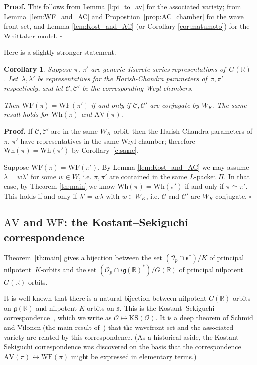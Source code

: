 \documentclass[10pt,leqno]{article}
\newtheorem{corollary}[equation]{Corollary}
\numberwithin{equation}{section}
\newcommand{\qed}{\hfill $\square$ \medskip}
\newenvironment{proof}[1][Proof]{\noindent\textbf{#1.} }{\qed}
\renewcommand{\O}{\mathcal O}
\newcommand{\R}{\mathbb R}
\newcommand{\g}{\mathfrak g}
\newcommand{\s}{\mathfrak s}
\newcommand{\AV}{\mathrm{AV}}
\newcommand{\KS}{\mathrm{KS}}
\newcommand{\Wh}{\mathrm{Wh}}
\newcommand{\WF}{\mathrm{WF}}
\newcommand{\Op}{\O_p}
\begin{document}
\begin{proof}
This follows from Lemma \ref{l:pi_to_av} for the associated variety;
from Lemma~\ref{lem:WF_and_AC} and Proposition~\ref{prop:AC_chamber} for the wave front set, and Lemma \ref{lem:Kost_and_AC} (or Corollary \ref{cor:matumoto})
for the Whittaker model.
\end{proof}

Here is a slightly stronger statement.

\begin{corollary}
\label{l:equalWhittaker}
Suppose $\pi$, $\pi'$ are generic discrete series representations of~$G(\R)$. Let~$\lambda, \lambda'$ be representatives for the Harish-Chandra parameters of~$\pi, \pi'$ respectively, and let $\mathscr{C}, \mathscr{C}'$ be the corresponding Weyl chambers. 

Then $\WF(\pi)=\WF(\pi')$ if and only if $\mathscr{C}, \mathscr{C}'$ are conjugate by $W_K$.
The same result holds for $\Wh(\pi)$ and $\AV(\pi)$. 
\end{corollary}

\begin{proof}
If  $\mathscr{C}, \mathscr{C}'$ are in the same $W_K$-orbit, then the Harish-Chandra parameters of $\pi$, $\pi'$ have representatives in the same Weyl chamber; therefore $\Wh(\pi)=\Wh(\pi')$ by Corollary~\ref{c:same}.

Suppose $\WF(\pi)=\WF(\pi')$. By Lemma \ref{lem:Kost_and_AC} we may assume
$\lambda=w\lambda'$ for some $w\in W$, i.e. $\pi,\pi'$ are contained
in the same $L$-packet $\Pi$. In that case, by Theorem \ref{th:main} 
we know $\Wh(\pi)=\Wh(\pi')$ if and only if $\pi\simeq \pi'$.
This holds if and only if $\lambda'=w\lambda$ with $w\in W_K$, 
i.e. $\mathscr{C}$ and $\mathscr{C}'$ are $W_K$-conjugate.
\end{proof}


\subsection{$\AV$ and $\WF$: the Kostant--Sekiguchi correspondence } \label{sec:Sekiguchi}

Theorem~\ref{th:main} gives a bijection between the set $(\Op \cap \s^*)/K$ of principal nilpotent~$K$-orbits and the set $(\Op \cap i\g(\R)^*)/G(\R)$ of principal nilpotent~$G(\R)$-orbits. 

It is well known that there is a natural bijection between nilpotent $G(\R)$-orbits on $\g(\R)$ and nilpotent $K$ orbits on $\s$. 
This is the Kostant--Sekiguchi
correspondence~\cite{sekiguchi}, which we write as $\O \mapsto \KS(\O)$. It is a deep theorem of
Schmid and Vilonen (the main result of~\cite{SV1}) that the wavefront
set and the associated variety are related by this
correspondence. (As a historical aside, the Kostant--Sekiguchi
correspondence was discovered on the basis that the correspondence
$\AV(\pi) \leftrightarrow \WF(\pi)$ might be expressed in elementary
terms.)
\end{document}
